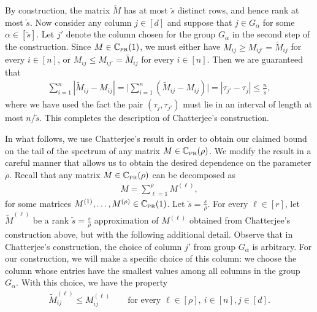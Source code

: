 \documentclass[11pt, hidelinks]{article} %
\newcommand{\numrows}{n}
\newcommand{\numcols}{d}
\newcommand{\wtmatrix}{M}
\newcommand{\wt}{\wtmatrix}
\newcommand{\matrixset}{\mathbb{C}}
\newcommand{\permset}{\matrixset_{\mbox{\tiny PR}}}
\newcommand{\permone}{\permset(1)}
\newcommand{\nnrank}{r}
\newcommand{\permrank}{\rho}
\begin{document}
By construction, the matrix $\widetilde{\wtmatrix}$ has at most
$\widetilde{s}$ distinct rows, and hence rank at most $\widetilde{s}$.
Now consider any column $j \in [\numcols]$ and suppose that $j \in
G_\alpha$ for some $\alpha \in [\widetilde{s}]$. Let $j'$ denote the column chosen for the group $G_\alpha$
in the second step of the construction. Since $\wt \in \permone$, we
must either have $\wt_{ij} \geq \wt_{ij'} =
\widetilde{\wtmatrix}_{ij}$ for every $i \in [\numrows]$, or $\wt_{ij}
\leq \wt_{ij'} = \widetilde{\wt}_{ij}$ for every $i \in
     [\numrows]$. Then we are guaranteed that
\begin{align}
\label{eq:STSVDChatterjeeRankOneAbs}
\sum_{i=1}^\numrows | \widetilde{\wt}_{ij} - \wt_{ij}| = \mid
\sum_{i=1}^\numrows ( \widetilde{\wt}_{ij} - \wt_{ij} ) \mid = |
\tau_{j'} - \tau_{j}| \leq \frac{\numrows}{\widetilde{s}},
\end{align}
where we have used the fact the pair $(\tau_j, \tau_{j'})$ must lie in
an interval of length at most $\numrows/\widetilde{s}$.  This
completes the description of Chatterjee's construction.

In what follows, we use Chatterjee's result in order to obtain our
claimed bound on the tail of the spectrum of any matrix $\wt \in
\permset(\permrank)$. We modify the result in a careful 
manner that allows us to obtain the desired dependence on the
parameter $\permrank$. Recall that any matrix $\wt \in
\permset(\permrank)$ can be decomposed as
\begin{align*}
\wtmatrix = \sum_{\ell=1}^{\permrank} \wt^{(\ell)},
\end{align*}
for some matrices $\wt^{(1)},\ldots,\wt^{(\permrank)} \in \permset(1)$. Let $\widetilde{s} = \frac{s}{\permrank}$. For every $\ell \in [\nnrank]$, let $\widetilde{\wt}^{(\ell)}$ be a rank $\widetilde{s} = \frac{s}{\permrank}$ approximation of $\wt^{(\ell)}$ obtained from Chatterjee's construction above, but with the following additional detail. Observe that in Chatterjee's construction, the choice of column $j'$ from group $G_\alpha$ is arbitrary. For our construction, we will make a specific choice of this column: we choose the column whose entries have the smallest values among all columns in the group $G_\alpha$. With this choice, we have the property 
\begin{align}
\label{EqnMonotoneApprox}
\widetilde{\wt}^{(\ell)}_{ij} \leq \wtmatrix^{(\ell)}_{ij} \qquad \mbox{for every $\ell \in [\permrank],\ i \in [\numrows], j \in [\numcols]$}.
\end{align}
\end{document}
